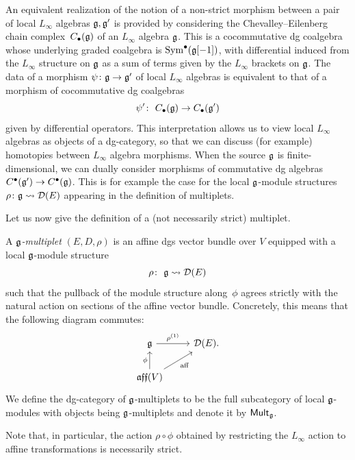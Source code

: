 \documentclass[pdftex]{sigma}
\numberwithin{equation}{section}
\def\cat#1{\ensuremath{\mathsf{#1}}}
\DeclareMathOperator{\Mult}{\cat{Mult}}
\def\lie#1{\ensuremath{\mathfrak{#1}}}
\def\aff{\ensuremath{\lie{aff}}}
\DeclareMathOperator{\Sym}{Sym}
\begin{document}
\begin{rmk}
	An equivalent realization of the notion of a non-strict morphism between a pair of local $L_\infty$ algebras $\mathfrak g,\mathfrak g'$ is provided by considering the Chevalley--Eilenberg chain complex~$C_\bullet(\mathfrak g)$ of an $L_\infty$ algebra $\mathfrak g$. This is a cocommutative dg coalgebra whose underlying graded coalgebra is $\Sym^\bullet(\fg[-1])$, with differential induced from the $L_\infty$ structure on $\mathfrak g$ as a sum of terms given by the $L_\infty$ brackets on $\mathfrak g$. The data of a morphism $\psi \colon \mathfrak g \to \mathfrak g'$ of local $L_\infty$ algebras is equivalent to that of a morphism of cocommutative dg coalgebras
	\[\psi' \colon \ C_\bullet(\mathfrak g) \to C_\bullet(\mathfrak g')\]
	given by differential operators. This interpretation allows us to view local $L_\infty$ algebras as objects of a dg-category, so that we can discuss (for example) homotopies between $L_\infty$ algebra morphisms. When the source $\mathfrak g$ is finite-dimensional, we can dually consider morphisms of commutative dg algebras $C^\bullet(\mathfrak g') \to C^\bullet(\mathfrak g)$. This is for example the case for the local $\mathfrak g$-module structures $\rho \colon \mathfrak g \rightsquigarrow \mathcal D(E)$ appearing in the definition of multiplets.
\end{rmk}

Let us now give the definition of a (not necessarily strict) multiplet.
\begin{dfn}
	A \emph{$\mathfrak g$-multiplet} $(E,D,\rho)$ is an affine dgs vector bundle over $V$ equipped with a local $\mathfrak g$-module structure
	\begin{equation*}
	\rho\colon \ \mathfrak g \rightsquigarrow \mathcal D(E)
	\end{equation*}
	such that the pullback of the module structure along~$\phi$ agrees strictly with the natural action on sections of the affine vector bundle. Concretely, this means that the following diagram commutes:
	\begin{equation*}
	\begin{tikzcd}
	\fg \arrow[r, "\rho^{(1)}"] & \cD(E). \\
	\aff(V) \arrow[ru, "\mathrm{aff}" '] \arrow[u,"\phi"]
	\end{tikzcd}
	\end{equation*}
	We define the dg-category of $\mathfrak g$-multiplets to be the full subcategory of local $\mathfrak g$-modules with objects being $\mathfrak g$-multiplets and denote it by $\Mult_{\fg}$.
\end{dfn}

\begin{rmk}
	Note that, in particular, the action $\rho \circ \phi$ obtained by restricting the $L_\infty$ action to affine transformations is necessarily strict.
\end{rmk}
\end{document}
